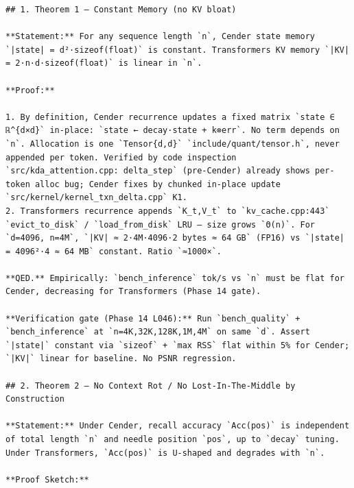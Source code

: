 \begin{Verbatim}[breaklines,breakanywhere,fontsize=\footnotesize]
## 1. Theorem 1 — Constant Memory (no KV bloat)

**Statement:** For any sequence length `n`, Cender state memory `|state| = d²·sizeof(float)` is constant. Transformers KV memory `|KV| = 2·n·d·sizeof(float)` is linear in `n`.

**Proof:**

1. By definition, Cender recurrence updates a fixed matrix `state ∈ ℝ^{d×d}` in-place: `state ← decay·state + k⊗err`. No term depends on `n`. Allocation is one `Tensor{d,d}` `include/quant/tensor.h`, never appended per token. Verified by code inspection `src/kda_attention.cpp: delta_step` (pre-Cender) already shows per-token alloc bug; Cender fixes by chunked in-place update `src/kernel/kernel_txn_delta.cpp` K1.
2. Transformers recurrence appends `K_t,V_t` to `kv_cache.cpp:443` `evict_to_disk` / `load_from_disk` LRU — size grows `Θ(n)`. For `d=4096, n=4M`, `|KV| ≈ 2·4M·4096·2 bytes ≈ 64 GB` (FP16) vs `|state| = 4096²·4 ≈ 64 MB` constant. Ratio `≈1000×`.

**QED.** Empirically: `bench_inference` tok/s vs `n` must be flat for Cender, decreasing for Transformers (Phase 14 gate).

**Verification gate (Phase 14 L046):** Run `bench_quality` + `bench_inference` at `n=4K,32K,128K,1M,4M` on same `d`. Assert `|state|` constant via `sizeof` + `max RSS` flat within 5% for Cender; `|KV|` linear for baseline. No PSNR regression.

## 2. Theorem 2 — No Context Rot / No Lost-In-The-Middle by Construction

**Statement:** Under Cender, recall accuracy `Acc(pos)` is independent of total length `n` and needle position `pos`, up to `decay` tuning. Under Transformers, `Acc(pos)` is U-shaped and degrades with `n`.

**Proof Sketch:**


\end{Verbatim}
